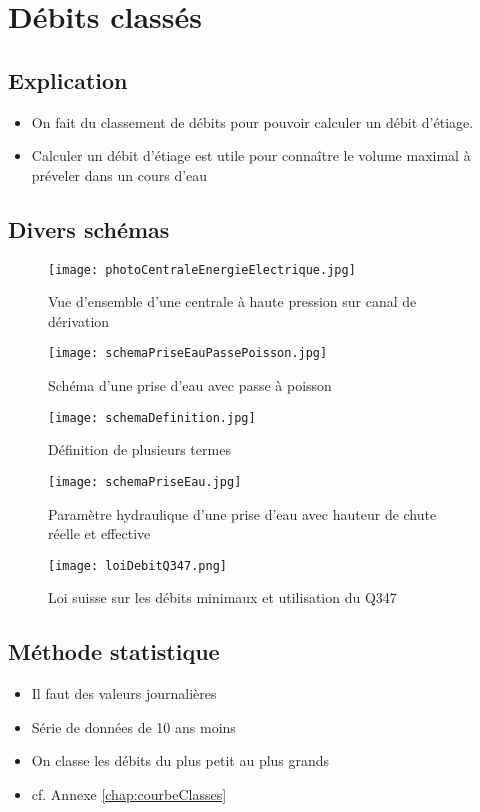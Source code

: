 \chapter{Débits classés}

\section{Explication}
\begin{itemize}
    \item On fait du classement de débits pour pouvoir calculer un débit d'étiage.
    \item Calculer un débit d'étiage est utile pour connaître le volume maximal à préveler dans un cours d'eau
\end{itemize}

\section{Divers schémas}
\begin{figure}[H]
    \centering
    \texttt{[image: photoCentraleEnergieElectrique.jpg]}
    \caption{Vue d'ensemble d'une centrale à haute pression sur canal de dérivation}
\end{figure}

\begin{figure}[H]
    \centering
    \texttt{[image: schemaPriseEauPassePoisson.jpg]}
    \caption{Schéma d'une prise d'eau avec passe à poisson}
\end{figure}

\begin{figure}[H]
    \centering
    \texttt{[image: schemaDefinition.jpg]}
    \caption{Définition de plusieurs termes}
\end{figure}

\begin{figure}[H]
    \centering
    \texttt{[image: schemaPriseEau.jpg]}
    \caption{Paramètre hydraulique d'une prise d'eau avec hauteur de chute réelle et effective}
\end{figure}

\begin{figure}[H]
    \centering
    \texttt{[image: loiDebitQ347.png]}
    \caption{Loi suisse sur les débits minimaux et utilisation du Q347}
    \label{fig:loiQ347}
\end{figure}


\section{Méthode statistique}
\begin{itemize}
    \item Il faut des valeurs journalières
    \item Série de données de 10 ans moins
    \item On classe les débits du plus petit au plus grands
    \item cf. Annexe \ref{chap:courbeClasses}
\end{itemize}

